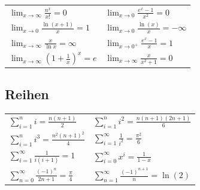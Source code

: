 \begin{flushleft}
\begin{center}
\begin{tabularx}{\linewidth}{XX}
    $\lim_{x \to \infty} \frac{n^x}{x!} = 0$ & $\lim_{x \to 0} \frac{e^x - 1}{x^2} = 0$ \\
    $\lim_{x \to 0} \frac{\ln(x+1)}{x} = 1$ & $\lim_{x \to 0} \frac{\ln(x)}{x} = -\infty$ \\
    $\lim_{x \to \infty} \frac{x}{\ln x} = \infty$ & $\lim_{x \to 0^+} \frac{e^x - 1}{x} = 1$ \\
    $\lim_{x \to \infty} \left( 1 + \frac{1}{x} \right)^x = e$ & $\lim_{x \to \infty} \frac{x}{x^2 + 1} = 0$ \\
    \bottomrule
  \end{tabularx}
\end{center}


\subsection{Reihen}
\begin{center}
  \begin{tabularx}{\linewidth}{XX}
    \toprule
    $\sum_{i=1}^{n} i = \frac{n(n+1)}{2}$ & $\sum_{i=1}^{n} i^2 = \frac{n(n+1)(2n+1)}{6}$ \\
    $\sum_{i=1}^{n} i^3 = \frac{n^2 (n+1)^2}{4} $ & $\sum_{i=1}^{\infty} \frac{1}{i^2} = \frac{\pi ^2}{6}$ \\
    $\sum_{i=1}^{ \infty} \frac{1}{i (i+1	)} =1$ &$\sum_{i=0}^{\infty} x^i = \frac{1}{1-x}$\\
     $\sum_{n=0}^{\infty}\frac{(-1)^n}{2n+1} = \frac{\pi}{4}$& $\sum_{n=1}^{\infty}\frac{(-1)^{n+1}}{n} = \ln(2)$  \\
    
    
    \bottomrule
  \end{tabularx}
\end{center}





\end{flushleft}
